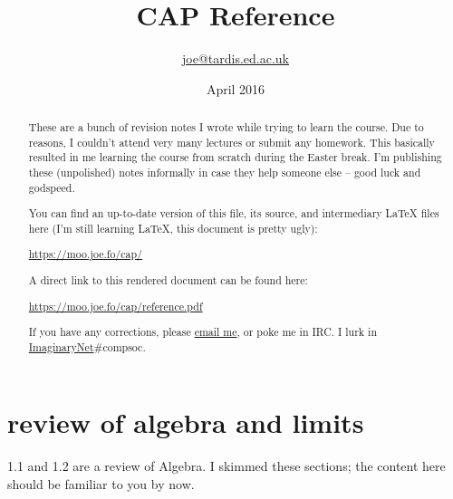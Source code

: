 \documentclass[10pt,a4paper]{report}
\begin{document}

\title{CAP Reference}
\author{\href{mailto:joe@tardis.ed.ac.uk}{joe@tardis.ed.ac.uk}}
\date{April 2016}


\begin{titlepage}
\maketitle
\thispagestyle{empty}
\end{titlepage}


\renewcommand{\abstractname}{calculus and its applications}
\begin{abstract}
These are a bunch of revision notes I wrote while trying to learn the course. Due to reasons, I couldn't attend very many lectures or submit any homework. This basically resulted in me learning the course from scratch during the Easter break. I'm publishing these (unpolished) notes informally in case they help someone else -- good luck and godspeed.

You can find an up-to-date version of this file, its source, and intermediary LaTeX files here (I'm still learning LaTeX, this document is pretty ugly):

\noindent \url{https://moo.joe.fo/cap/}

A direct link to this rendered document can be found here:

\noindent \url{https://moo.joe.fo/cap/reference.pdf}


If you have any corrections, please \href{mailto:joe@tardis.ed.ac.uk}{email me}, or poke me in IRC. I lurk in \href{http://imaginarynet.uk}{ImaginaryNet}\#compsoc.

\thispagestyle{empty}
\hypersetup{pageanchor=false} %
\end{abstract}

\newpage

\hypersetup{pageanchor=true}
\tableofcontents




\chapter{review of algebra and limits}

1.1 and 1.2 are a review of Algebra. I skimmed these sections; the content here should be familiar to you by now.
\end{document}
